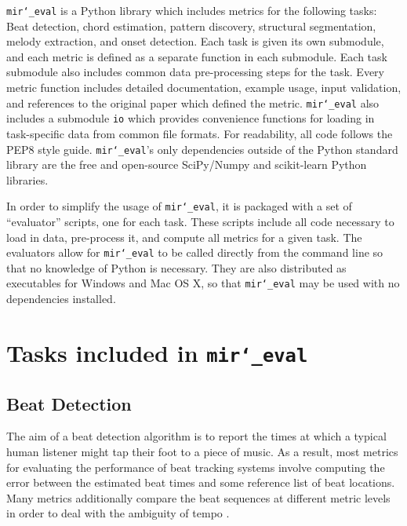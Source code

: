 \documentclass{article}
\def\mireval{\texttt{mir\char`_eval}}
\begin{document}
\mireval{} is a Python library which includes metrics for the following tasks: Beat detection, chord estimation, pattern discovery, structural segmentation, melody extraction, and onset detection.
Each task is given its own submodule, and each metric is defined as a separate function in each submodule.
Each task submodule also includes common data pre-processing steps for the task.
Every metric function includes detailed documentation, example usage, input validation, and references to the original paper which defined the metric.
\mireval{} also includes a submodule \texttt{io} which provides convenience functions for loading in task-specific data from common file formats.
For readability, all code follows the PEP8 style guide\cite{van2001pep}.
\mireval{}'s only dependencies outside of the Python standard library are the free and open-source SciPy/Numpy\cite{jones2001scipy} and scikit-learn\cite{pedregosa2011scikit} Python libraries.

In order to simplify the usage of \mireval{}, it is packaged with a set of ``evaluator'' scripts, one for each task.
These scripts include all code necessary to load in data, pre-process it, and compute all metrics for a given task.
The evaluators allow for \mireval{} to be called directly from the command line so that no knowledge of Python is necessary.
They are also distributed as executables for Windows and Mac OS X, so that \mireval{} may be used with no dependencies installed.

\section{Tasks included in \mireval{}}
\label{sec:tasks}

\subsection{Beat Detection}

The aim of a beat detection algorithm is to report the times at which a typical human listener might tap their foot to a piece of music.
As a result, most metrics for evaluating the performance of beat tracking systems involve computing the error between the estimated beat times and some reference list of beat locations.
Many metrics additionally compare the beat sequences at different metric levels in order to deal with the ambiguity of tempo \cite{levy2011improving}.
\end{document}

